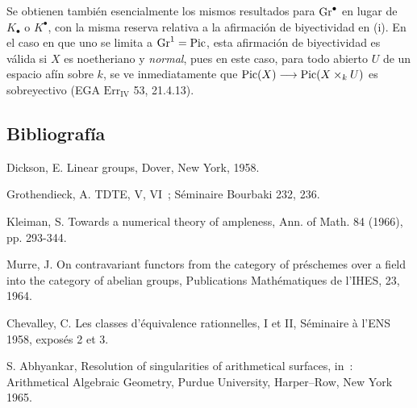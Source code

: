 Se obtienen también esencialmente los mismos resultados para \(\Gr^\bullet\) en lugar de \(K_\bullet\) o \(K^\bullet\), con la misma reserva relativa a la afirmación de biyectividad en (i). En el caso en que uno se limita a \(\Gr^1=\Pic\), esta afirmación de biyectividad es válida si \(X\) es noetheriano y \emph{normal}, pues en este caso, para todo abierto \(U\) de un espacio afín sobre \(k\), se ve inmediatamente que \(\Pic(X)\longrightarrow \Pic(X\times_k U)\) es sobreyectivo (EGA \(\mathrm{Err}_{\mathrm{IV}}\) 53, 21.4.13).

\subsection*{Bibliografía}
\begin{enumerate}[label={[\arabic*]}]
\item Dickson, E. Linear groups, Dover, New York, 1958.
\item Grothendieck, A. TDTE, V, VI~; Séminaire Bourbaki 232, 236.
\item Kleiman, S. Towards a numerical theory of ampleness, Ann. of Math. 84 (1966), pp. 293-344.
\item Murre, J. On contravariant functors from the category of préschemes over a field into the category of abelian groups, Publications Mathématiques de l'IHES, 23, 1964.
\item Chevalley, C. Les classes d'équivalence rationnelles, I et II, Séminaire à l'ENS 1958, exposés 2 et 3.
\item S. Abhyankar, Resolution of singularities of arithmetical surfaces, in~: Arithmetical Algebraic Geometry, Purdue University, Harper--Row, New York 1965.
\end{enumerate}

\providecommand{\Isom}{\operatorname{Isom}}
\providecommand{\Hom}{\operatorname{Hom}}
\providecommand{\Coker}{\operatorname{Coker}}
\providecommand{\Nil}{\operatorname{Nil}}
\providecommand{\im}{\operatorname{Im}}
\providecommand{\coker}{\operatorname{coker}}
\providecommand{\Supp}{\operatorname{Supp}}
\providecommand{\fppf}{\mathrm{fppf}}
\providecommand{\zar}{\mathrm{zar}}
\providecommand{\GL}{\operatorname{Gl}}
\providecommand{\Gr}{\operatorname{Gr}}
\providecommand{\Pic}{\operatorname{Pic}}
\providecommand{\Spec}{\operatorname{Spec}}
\providecommand{\V}{\operatorname{V}}
\providecommand{\Ass}{\operatorname{Ass}}

\newpage
